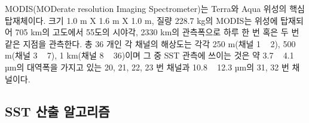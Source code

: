 MODIS(MODerate resolution Imaging Spectrometer)는 Terra와 Aqua 위성의 핵심 탑재체이다. 크기 1.0 m X 1.6 m X 1.0 m, 질량 228.7 kg의 MODIS는 위성에 탑재되어 705 km의 고도에서 55도의 시야각, 2330 km의 관측폭으로 하루 한 번 혹은 두 번 같은 지점을 관측한다. 총 36 개인 각 채널의 해상도는 각각 250 m(채널 1 ~ 2), 500 m(채널 3 ~ 7), 1 km(채널 8 ~ 36)이며 그 중 SST 관측에 쓰이는 것은 약 3.7 ~ 4.1 µm의 대역폭을 가지고 있는 20, 21, 22, 23 번 채널과 10.8 ~ 12.3 µm의 31, 32 번 채널이다.

\subsection{SST 산출 알고리즘}